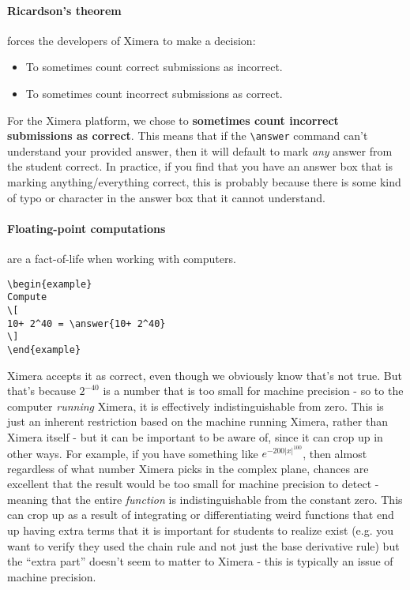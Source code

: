 \documentclass{ximera}
\begin{document}
\paragraph{Ricardson's theorem} forces the developers of Ximera to make a
decision:
\begin{itemize}
  \item To sometimes count correct submissions as incorrect.
  \item To sometimes count incorrect submissions as correct.
\end{itemize}
For the Ximera platform, we chose to \textbf{sometimes count incorrect
  submissions as correct}. This means that if the \verb|\answer| command
can't understand your provided answer, then it will default to mark
\textit{any} answer from the student correct. In practice, if you find that you
have an answer box that is marking anything/everything correct, this is
probably because there is some kind of typo or character
in the answer box that it cannot understand.

\paragraph{Floating-point computations} are a fact-of-life when working with
computers.

\begin{verbatim}
\begin{example}
Compute
\[
10+ 2^40 = \answer{10+ 2^40}
\]
\end{example}
\end{verbatim}

Ximera accepts it as correct, even though we obviously know that's not
true. But that's because $2^{-40}$ is a number that is too small for machine
precision - so to the computer \textit{running} Ximera, it is effectively
indistinguishable from zero. This is just an inherent restriction based on the
machine running Ximera, rather than Ximera itself - but it can be important to
be aware of, since it can crop up in other ways. For example, if you have
something like $e^{-200|x|^{100}}$, then almost regardless of what number
Ximera picks in the complex plane, chances are excellent that the result would
be too small for machine precision to detect - meaning that the entire
\textit{function} is indistinguishable from the constant zero. This can crop up
as a result of integrating or differentiating weird functions that end up
having extra terms that it is important for students to realize exist (e.g. you
want to verify they used the chain rule and not just the base derivative rule)
but the ``extra part'' doesn't seem to matter to Ximera - this is typically an
issue of machine precision.
\end{document}
